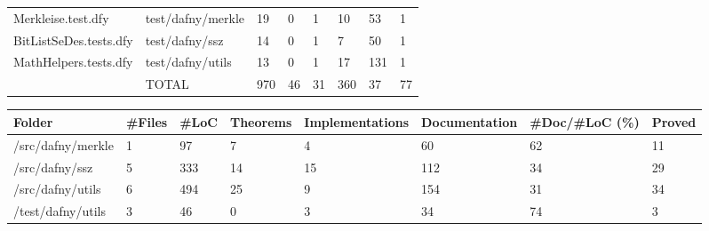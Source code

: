 \documentclass[a4paper, 12pt]{article}
\begin{document}
\begin{tabular}{llllllll}
     Merkleise.test.dfy &  test/dafny/merkle &   19 &        0 &               1 &            10 &            53 &      1 \\
 BitListSeDes.tests.dfy &     test/dafny/ssz &   14 &        0 &               1 &             7 &            50 &      1 \\
  MathHelpers.tests.dfy &   test/dafny/utils &   13 &        0 &               1 &            17 &           131 &      1 \\
                        &              TOTAL &  970 &       46 &              31 &           360 &            37 &     77 \\
\bottomrule
\end{tabular}

\vspace{2em}
\begin{tabular}{llllllll}
\toprule
            Folder & \#Files & \#LoC & Theorems & Implementations & Documentation & \#Doc/\#LoC (\%) & Proved \\
\midrule
 /src/dafny/merkle &      1 &   97 &        7 &               4 &            60 &            62 &     11 \\
    /src/dafny/ssz &      5 &  333 &       14 &              15 &           112 &            34 &     29 \\
  /src/dafny/utils &      6 &  494 &       25 &               9 &           154 &            31 &     34 \\
 /test/dafny/utils &      3 &   46 &        0 &               3 &            34 &            74 &      3 \\
\bottomrule
\end{tabular}
\end{document}
